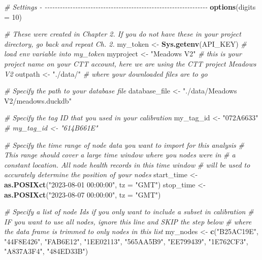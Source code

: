 \documentclass[
]{book}
\newenvironment{Shaded}{\begin{snugshade}}{\end{snugshade}}
\newcommand{\AttributeTok}[1]{\textcolor[rgb]{0.13,0.29,0.53}{#1}}
\newcommand{\CommentTok}[1]{\textcolor[rgb]{0.56,0.35,0.01}{\textit{#1}}}
\newcommand{\DecValTok}[1]{\textcolor[rgb]{0.00,0.00,0.81}{#1}}
\newcommand{\FunctionTok}[1]{\textcolor[rgb]{0.13,0.29,0.53}{\textbf{#1}}}
\newcommand{\NormalTok}[1]{#1}
\newcommand{\OtherTok}[1]{\textcolor[rgb]{0.56,0.35,0.01}{#1}}
\newcommand{\StringTok}[1]{\textcolor[rgb]{0.31,0.60,0.02}{#1}}
\begin{document}
\begin{Shaded}
\begin{Highlighting}[]
\CommentTok{\# Settings {-} {-}{-}{-}{-}{-}{-}{-}{-}{-}{-}{-}{-}{-}{-}{-}{-}{-}{-}{-}{-}{-}{-}{-}{-}{-}{-}{-}{-}{-}{-}{-}{-}{-}{-}{-}{-}{-}{-}{-}{-}{-}{-}{-}{-}{-}{-}{-}{-}{-}{-}{-}{-}{-}{-}{-}{-}{-}{-}{-}{-}{-}{-}{-}{-}}
\FunctionTok{options}\NormalTok{(}\AttributeTok{digits =} \DecValTok{10}\NormalTok{)}

\CommentTok{\# These were created in Chapter 2. If you do not have these in your project directory, go back and repeat Ch. 2.}
\NormalTok{my\_token }\OtherTok{\textless{}{-}} \FunctionTok{Sys.getenv}\NormalTok{(}\StringTok{\textquotesingle{}API\_KEY\textquotesingle{}}\NormalTok{) }\CommentTok{\# load env variable into my\_token}
\NormalTok{myproject }\OtherTok{\textless{}{-}} \StringTok{"Meadows V2"} \CommentTok{\# this is your project name on your CTT account, here we are using the CTT project \textquotesingle{}Meadows V2\textquotesingle{}}
\NormalTok{outpath }\OtherTok{\textless{}{-}} \StringTok{"./data/"} \CommentTok{\# where your downloaded files are to go}

\CommentTok{\# Specify the path to your database file}
\NormalTok{database\_file }\OtherTok{\textless{}{-}} \StringTok{"./data/Meadows V2/meadows.duckdb"}

\CommentTok{\# Specify the tag ID that you used in your calibration}
\NormalTok{my\_tag\_id }\OtherTok{\textless{}{-}} \StringTok{"072A6633"}
\CommentTok{\# my\_tag\_id \textless{}{-} "614B661E"}

\CommentTok{\# Specify the time range of node data you want to import for this analysis}
\CommentTok{\#   This range should cover a large time window where you nodes were in}
\CommentTok{\#   a constant location.  All node health records in this time window}
\CommentTok{\#   will be used to accurately determine the position of your nodes}
\NormalTok{start\_time }\OtherTok{\textless{}{-}} \FunctionTok{as.POSIXct}\NormalTok{(}\StringTok{"2023{-}08{-}01 00:00:00"}\NormalTok{, }\AttributeTok{tz =} \StringTok{"GMT"}\NormalTok{)}
\NormalTok{stop\_time }\OtherTok{\textless{}{-}} \FunctionTok{as.POSIXct}\NormalTok{(}\StringTok{"2023{-}08{-}07 00:00:00"}\NormalTok{, }\AttributeTok{tz =} \StringTok{"GMT"}\NormalTok{)}

\CommentTok{\# Specify a list of node Ids if you only want to include a subset in calibration}
\CommentTok{\# IF you want to use all nodes, ignore this line and SKIP the step below}
\CommentTok{\# where the data frame is trimmed to only nodes in this list}
\NormalTok{my\_nodes }\OtherTok{\textless{}{-}} \FunctionTok{c}\NormalTok{(}\StringTok{"B25AC19E"}\NormalTok{, }\StringTok{"44F8E426"}\NormalTok{, }\StringTok{"FAB6E12"}\NormalTok{, }\StringTok{"1EE02113"}\NormalTok{, }\StringTok{"565AA5B9"}\NormalTok{, }\StringTok{"EE799439"}\NormalTok{, }\StringTok{"1E762CF3"}\NormalTok{, }\StringTok{"A837A3F4"}\NormalTok{, }\StringTok{"484ED33B"}\NormalTok{)}


\end{Highlighting}
\end{Shaded}
\end{document}
